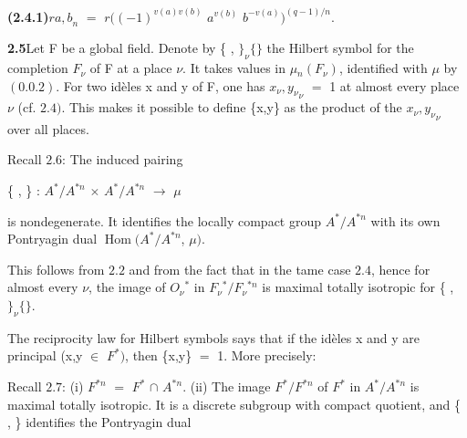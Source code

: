 \documentclass[10pt,a4paper]{article}
\begin{document}
\par\noindent\textbf{(2.4.1)}\quad $r{a,b}_n$ $=$ $r((-1)^{v(a)v(b)}$ $a^{v(b)}$ $b^{-v(a)})^{(q-1)/n}$.\par
\par\noindent\textbf{2.5}\quad Let F be a global field. Denote by \{ , $\}_\nu\{\}$ the Hilbert symbol for the completion $F_\nu{}$ of F at a place $\nu{}$. It takes values in $\mu{}_n(F_\nu{})$, identified with $\mu{}$ by $(0.0.2)$. For two idèles x and y of F, one has ${x_\nu{},y_\nu{}}_\nu{}$ $=$ 1 at almost every place $\nu{}$ (cf. $2.4)$. This makes it possible to define \{x,y\} as the product of the ${x_\nu{},y_\nu{}}_\nu{}$ over all places.\par
\par Recall $2.6$: The induced pairing\par
\par\smallskip\begin{center}\begin{minipage}{0.96\textwidth}\centering
\{ , \} : $A^*/A^{*n}$ $\times{}$ $A^*/A^{*n}$ $\to{}$ $\mu{}$
\end{minipage}\end{center}\smallskip
\par is nondegenerate. It identifies the locally compact group $A^*/A^{*n}$ with its own Pontryagin dual $\operatorname{Hom}(A^*/A^{*n}$, $\mu{})$.\par
\par This follows from $2.2$ and from the fact that in the tame case $2.4$, hence for almost every $\nu{}$, the image of $O_\nu{}^*$ in $F_\nu{}^*/F_\nu{}^{*n}$ is maximal totally isotropic for \{ , $\}_\nu\{\}$.\par
\par The reciprocity law for Hilbert symbols says that if the idèles x and y are principal (x,y $\in{}$ $F^*)$, then \{x,y\} $=$ 1. More precisely:\par
\par Recall $2.7$: (i) $F^{*n}$ $=$ $F^*$ $\cap{}$ $A^{*n}$. (ii) The image $F^*/F^{*n}$ of $F^*$ in $A^*/A^{*n}$ is maximal totally isotropic. It is a discrete subgroup with compact quotient, and \{ , \} identifies the Pontryagin dual\par
\end{document}
